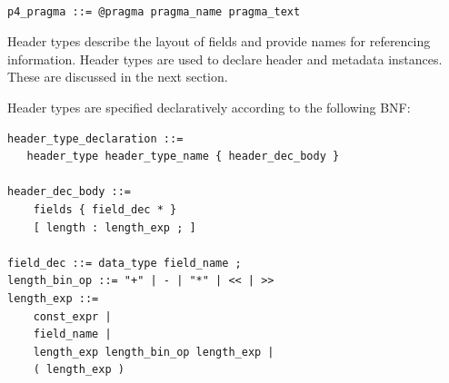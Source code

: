 \documentclass[12pt]{article}
\begin{document}
\begin{lstlisting}[style=BNFstyle]

p4_pragma ::= @pragma pragma_name pragma_text

\end{lstlisting}




Header types describe the layout of fields and provide names for referencing 
information. Header types are used to declare header and metadata instances. 
These are discussed in the next section.

Header types are specified declaratively according to the following BNF:

\begin{lstlisting}[style=BNFstyle]
header_type_declaration ::= 
   header_type header_type_name { header_dec_body }

header_dec_body ::=
    fields { field_dec * }
    [ length : length_exp ; ]

field_dec ::= data_type field_name ;
length_bin_op ::= "+" | - | "*" | << | >>
length_exp ::=
    const_expr |
    field_name |
    length_exp length_bin_op length_exp |
    ( length_exp )

\end{lstlisting}
\end{document}
